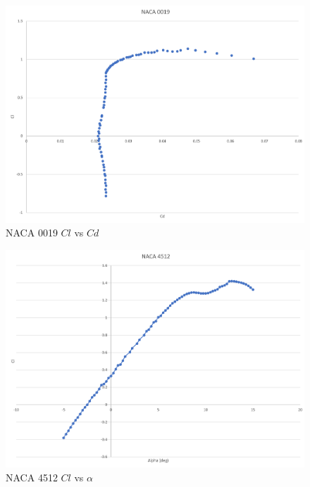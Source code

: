 \documentclass{article}
\begin{document}
\begin{figure}
\begin{center}
	\includegraphics[scale=0.4]{NACA0019clvscd.png}
	\caption{NACA 0019 $Cl$ vs $Cd$}
	\label{Figure 4:}
\end{center}
\end{figure}

\begin{figure}
\begin{center}
	\includegraphics[scale=0.4]{NACA4512clvsalpha.png}
	\caption{NACA 4512 $Cl$ vs $\alpha$}
	\label{Figure 5:}
\end{center}
\end{figure}
\end{document}
